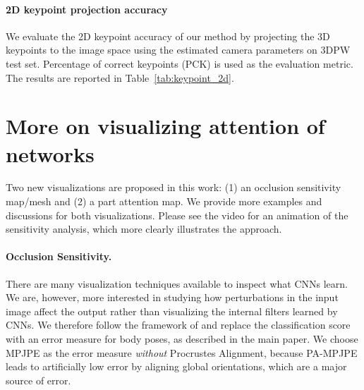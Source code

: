 \documentclass[10pt,twocolumn,letterpaper,usenames,dvipsnames]{article}
\newcommand{\threedpw}{\texttt{3DPW}\xspace}
\begin{document}
\begin{table}[h]
	\centering
	\caption{\textbf{Evaluation of 2D keypoint project accuracy on \threedpw dataset.}}
	\label{tab:keypoint_2d}
	\vspace{-2ex}
\end{table}{}

\paragraph{2D keypoint projection accuracy} 
We evaluate the 2D keypoint accuracy of our method by projecting the 3D keypoints to the image space using the estimated camera parameters on 3DPW test set. Percentage of correct keypoints (PCK) is used as the evaluation metric. The results are reported in Table~\ref{tab:keypoint_2d}.

\section{More on visualizing attention of networks}
Two new visualizations are proposed in this work: (1) an occlusion sensitivity map/mesh and (2) a part attention map. We provide more examples and discussions for both visualizations.
Please see the video for an animation of the sensitivity analysis, which more clearly illustrates the approach.

\paragraph{Occlusion Sensitivity.}
There are many visualization techniques \cite{mahendran2015understanding,selvaraju2017grad,zeiler2014visualizing,zhou2016learning} available to inspect what CNNs learn. We are, however, more interested in studying how perturbations in the input image affect the output rather than visualizing the internal filters learned by CNNs. We therefore follow the framework of \cite{zeiler2014visualizing} and replace the classification score with an error measure for body poses, as described in the main paper. 
We choose MPJPE as the error measure \emph{without} Procrustes Alignment, because PA-MPJPE leads to artificially low error by aligning global orientations, which are a major source of error.
\end{document}
